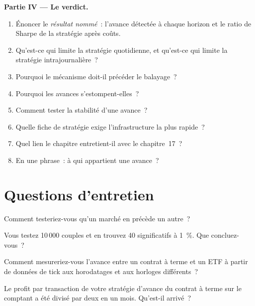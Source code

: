 \begin{problem}
\medskip\noindent\textbf{Partie IV --- Le verdict.}
\begin{enumerate}[resume]
\item Énoncer le \emph{résultat nommé}~: l'avance détectée à chaque horizon et le ratio de Sharpe de la stratégie après coûts.
\item Qu'est-ce qui limite la stratégie quotidienne, et qu'est-ce qui limite la stratégie intrajournalière~?
\item Pourquoi le mécanisme doit-il précéder le balayage~?
\item Pourquoi les avances s'estompent-elles~?
\item Comment tester la stabilité d'une avance~?
\item Quelle fiche de stratégie exige l'infrastructure la plus rapide~?
\item Quel lien le chapitre entretient-il avec le chapitre~17~?
\item En une phrase~: à qui appartient une avance~?
\end{enumerate}
\end{problem}

\section{Questions d'entretien}

\begin{interviewq}\label{iq:s1:cross-asset-lead-lag:1}
Comment testeriez-vous qu'un marché en précède un autre~?
\end{interviewq}

\begin{interviewq}\label{iq:s1:cross-asset-lead-lag:2}
Vous testez 10\,000 couples et en trouvez 40 significatifs à 1~\%. Que concluez-vous~?
\end{interviewq}

\begin{interviewq}\label{iq:s1:cross-asset-lead-lag:3}
Comment mesureriez-vous l'avance entre un contrat à terme et un ETF à partir de données de tick aux horodatages et aux horloges différents~?
\end{interviewq}

\begin{interviewq}\label{iq:s1:cross-asset-lead-lag:4}
Le profit par transaction de votre stratégie d'avance du contrat à terme sur le comptant a été divisé par deux en un mois. Qu'est-il arrivé~?
\end{interviewq}

